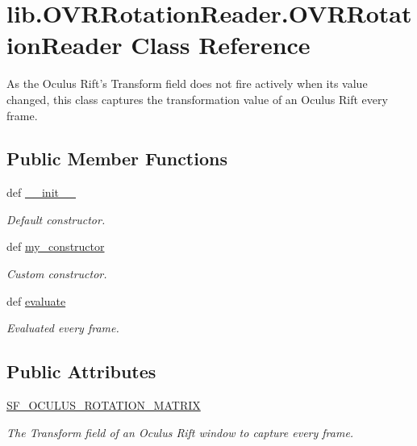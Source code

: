 \hypertarget{classlib_1_1OVRRotationReader_1_1OVRRotationReader}{\section{lib.\-O\-V\-R\-Rotation\-Reader.\-O\-V\-R\-Rotation\-Reader \-Class \-Reference}
\label{classlib_1_1OVRRotationReader_1_1OVRRotationReader}
}


\-As the \-Oculus \-Rift's \-Transform field does not fire actively when its value changed, this class captures the transformation value of an \-Oculus \-Rift every frame.  


\subsection*{\-Public \-Member \-Functions}
\begin{DoxyCompactItemize}
\item 
def \hyperlink{classlib_1_1OVRRotationReader_1_1OVRRotationReader_aef2c5483bc6cfd34afef4bc28b94e522}{\-\_\-\-\_\-init\-\_\-\-\_\-}
\begin{DoxyCompactList}\small\item\em \-Default constructor. \end{DoxyCompactList}\item 
def \hyperlink{classlib_1_1OVRRotationReader_1_1OVRRotationReader_a5e4278ad86ab9590708bc0bf695d2a7a}{my\-\_\-constructor}
\begin{DoxyCompactList}\small\item\em \-Custom constructor. \end{DoxyCompactList}\item 
def \hyperlink{classlib_1_1OVRRotationReader_1_1OVRRotationReader_a4ba8883df6339979c53e07e2a84f394e}{evaluate}
\begin{DoxyCompactList}\small\item\em \-Evaluated every frame. \end{DoxyCompactList}\end{DoxyCompactItemize}
\subsection*{\-Public \-Attributes}
\begin{DoxyCompactItemize}
\item 
\hyperlink{classlib_1_1OVRRotationReader_1_1OVRRotationReader_ada3aa45fa670f6de2b6b21f1238d9380}{\-S\-F\-\_\-\-O\-C\-U\-L\-U\-S\-\_\-\-R\-O\-T\-A\-T\-I\-O\-N\-\_\-\-M\-A\-T\-R\-I\-X}
\begin{DoxyCompactList}\small\item\em \-The \-Transform field of an \-Oculus \-Rift window to capture every frame. \end{DoxyCompactList}\end{DoxyCompactItemize}
